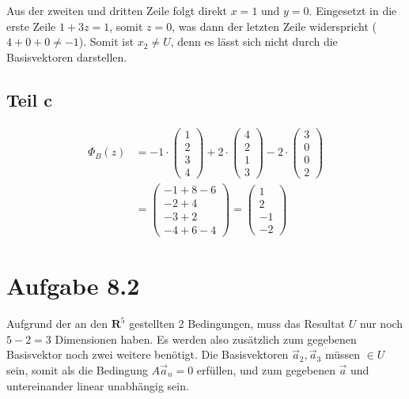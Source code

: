 \documentclass[a4paper,german,12pt,smallheadings]{scrartcl}
\begin{document}
Aus der zweiten und dritten Zeile folgt direkt $x = 1$ und $y = 0$. Eingesetzt
in die erste Zeile $1 + 3z = 1$, somit $z = 0$, was dann der letzten Zeile
widerspricht ($4 + 0 + 0 \neq -1$). Somit ist $x_2 \neq U$, denn es lässt sich
nicht durch die Basisvektoren darstellen.

\subsection*{Teil c}

\begin{align*}
  \Phi_B(z) &= -1 \cdot \begin{pmatrix} 1 \\ 2 \\ 3 \\ 4 \end{pmatrix} + 2 \cdot \begin{pmatrix} 4 \\ 2 \\ 1 \\ 3 \end{pmatrix} - 2 \cdot \begin{pmatrix} 3 \\ 0 \\ 0 \\ 2\end{pmatrix} \\
            &= \begin{pmatrix} -1 +8 -6 \\ -2 +4 \\ -3+2 \\ -4+6-4 \end{pmatrix} = \begin{pmatrix} 1 \\ 2 \\ -1 \\ -2\end{pmatrix}
\end{align*}

\section*{Aufgabe 8.2}
Aufgrund der an den $\mathbf{R}^5$ gestellten 2 Bedingungen, muss das Resultat
$U$ nur noch $5-2 = 3$ Dimensionen haben. Es werden also zusätzlich zum
gegebenen Basisvektor noch zwei weitere benötigt. Die Basisvektoren $\vec{a}_2,
\vec{a}_3$ müssen $\in U$ sein, somit als die Bedingung $A\vec{a}_n = 0$
erfüllen, und zum gegebenen $\vec{a}$ und untereinander linear unabhängig sein.
\end{document}
